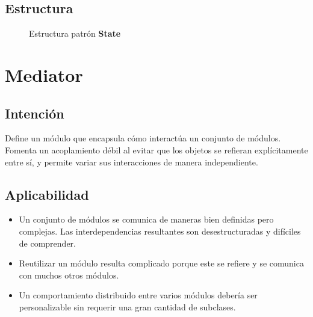 \subsection*{Estructura}

\begin{figure}[h]
\caption{Estructura patrón \textbf{State}}
\begin{center}
\end{center}
\end{figure}

\section{Mediator}
\label{anexoMediator}

\subsection*{Intención}
Define un módulo que encapsula cómo interactúa un conjunto de módulos. Fomenta un acoplamiento débil al evitar que los objetos se refieran explícitamente entre sí, y permite variar sus interacciones de manera independiente.

\subsection*{Aplicabilidad}
\begin{itemize}
\item Un conjunto de módulos se comunica de maneras bien definidas pero complejas. Las interdependencias resultantes son desestructuradas y difíciles de comprender.

\item Reutilizar un módulo resulta complicado porque este se refiere y se comunica con muchos otros módulos.

\item Un comportamiento distribuido entre varios módulos debería ser personalizable sin requerir una gran cantidad de subclases.
\end{itemize}

